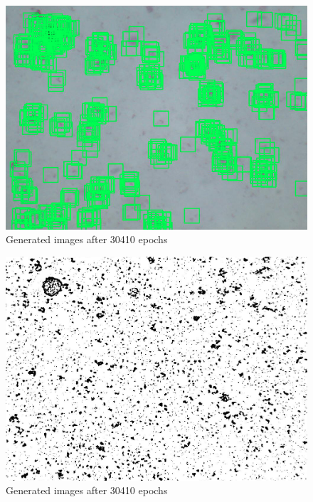 \begin{figure}[h]
\label{fig:gen250}
\begin{center}
\includegraphics[scale=0.45]{./images/object_detected.png}

\end{center}
\caption{Generated images after 30410 epochs}
\end{figure}


\begin{figure}[h]
\label{fig:gen250}
\begin{center}
\includegraphics[scale=0.45]{./images/threshold.png}

\end{center}
\caption{Generated images after 30410 epochs}
\end{figure}



